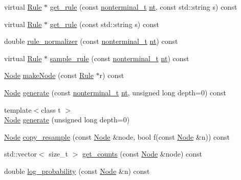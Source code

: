 \begin{DoxyCompactItemize}
\item 
virtual \hyperlink{class_rule}{Rule} $\ast$ \hyperlink{class_grammar_a3d13aad0e640f20e9eb7d0d148915576}{get\+\_\+rule} (const \hyperlink{_nonterminal_8h_a1c5bfe9b903f69c83bbde5da7035fef3}{nonterminal\+\_\+t} \hyperlink{class_grammar_a047b55bfbd87c52e9d969af62c2932ab}{nt}, const std\+::string s) const
\item 
virtual \hyperlink{class_rule}{Rule} $\ast$ \hyperlink{class_grammar_a1a48e2e6b4757c3398c60a20d759d307}{get\+\_\+rule} (const std\+::string s) const
\item 
double \hyperlink{class_grammar_a240019987945a694e26bebcebcf463fc}{rule\+\_\+normalizer} (const \hyperlink{_nonterminal_8h_a1c5bfe9b903f69c83bbde5da7035fef3}{nonterminal\+\_\+t} \hyperlink{class_grammar_a047b55bfbd87c52e9d969af62c2932ab}{nt}) const
\item 
virtual \hyperlink{class_rule}{Rule} $\ast$ \hyperlink{class_grammar_aba4d092714b8420d8c0a1be63e8566b6}{sample\+\_\+rule} (const \hyperlink{_nonterminal_8h_a1c5bfe9b903f69c83bbde5da7035fef3}{nonterminal\+\_\+t} \hyperlink{class_grammar_a047b55bfbd87c52e9d969af62c2932ab}{nt}) const
\item 
\hyperlink{class_node}{Node} \hyperlink{class_grammar_abc6f2a046bdf8df0be45912b5d8fe410}{make\+Node} (const \hyperlink{class_rule}{Rule} $\ast$r) const
\item 
\hyperlink{class_node}{Node} \hyperlink{class_grammar_af5dee7ec88bdd66edd023b3c935d2765}{generate} (const \hyperlink{_nonterminal_8h_a1c5bfe9b903f69c83bbde5da7035fef3}{nonterminal\+\_\+t} \hyperlink{class_grammar_a047b55bfbd87c52e9d969af62c2932ab}{nt}, unsigned long depth=0) const
\item 
{\footnotesize template$<$class t $>$ }\\\hyperlink{class_node}{Node} \hyperlink{class_grammar_a01bf556e22bfdd5ec87868869fd9330f}{generate} (unsigned long depth=0)
\item 
\hyperlink{class_node}{Node} \hyperlink{class_grammar_a28b35de7e71ac8f451cd3a65818fc1db}{copy\+\_\+resample} (const \hyperlink{class_node}{Node} \&node, bool f(const \hyperlink{class_node}{Node} \&n)) const
\item 
std\+::vector$<$ size\+\_\+t $>$ \hyperlink{class_grammar_a1e192e96e623cf9beb927cbd35bd7470}{get\+\_\+counts} (const \hyperlink{class_node}{Node} \&node) const
\item 
double \hyperlink{class_grammar_a4b19c0b8d0b4d792181ae47bd2f68268}{log\+\_\+probability} (const \hyperlink{class_node}{Node} \&n) const
\item 

\end{DoxyCompactItemize}

